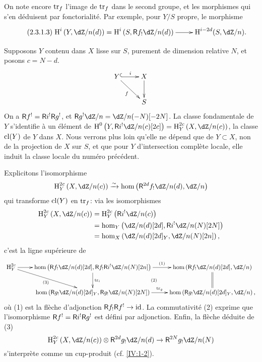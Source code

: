 On note encore $\operatorname{tr}_f$ l'image de $\operatorname{tr}_f$ dans le second groupe, et les 
morphismes qui s'en déduisent par fonctorialité. Par exemple, pour $Y/S$ 
propre, le morphisme 
\begin{equation*}\tag{2.3.1.3}\label{IV:eq:2-3-1-3}
\xymatrix{
  \h^i\left(Y,\dZ/n(d)\right) = \h^i\left(S,\R f_!\dZ/n(d)\right) \ar[r] 
    & \h^{i-2 d}(S,\dZ/n) \text{.}
}
\end{equation*}

Supposons $Y$ contenu dans $X$ lisse sur $S$, purement de dimension relative 
$N$, et posons $c=N-d$. 
\[\xymatrix{
  Y \ar@{^{(}->}[r]^-i \ar[dr]_-f 
    & X \ar[d] \\
  & S
}\]
On a $\mathsf{R} f^! = \mathsf{R} i^!\mathsf{R} g^!$, et $\R g^! \dZ/n=\dZ/n(-N)[-2 N]$. La classe 
fondamentale de $Y$ s'identifie à un élément de 
$\h^0\left(Y,\R i^!\dZ/n(c)[2 c]\right)=\h_Y^{2 c}\left(X,\dZ/n(c)\right)$, la 
classe $\operatorname{cl}(Y)$ de $Y$ dans $X$. Nous verrons plus loin qu'elle ne dépend que 
de $Y\subset X$, non de la projection de $X$ sur $S$, et que pour $Y$ 
d'intersection complète locale, elle induit la classe locale du numéro 
précédent. 

Explicitons l'isomorphisme 
\[
  \h_Y^{2 c}\left(X,\dZ/n(c)\right) \iso \hom\left(\R^{2 d}f_!\dZ/n(d),\dZ/n\right)
\]
qui transforme $\operatorname{cl}(Y)$ en $\operatorname{tr}_f$: via les isomorphismes 
\begin{align*}
  \h_Y^{2 c}\left(X,\dZ/n(c)\right) 
    &= \h_Y^{2 c}\left(\R i^!\dZ/n(c)\right) \\
    &= \hom_Y\left(\dZ/n(d)[2 d],\R i^!\dZ/n(N)[2 N]\right) \\
    &= \hom_X\left(\dZ/n(d)[2 d]_Y,\dZ/n(N)[2 n]\right) \text{,}
\end{align*}
c'est la ligne supérieure de 
\[\xymatrix{
  \h_Y^{2 c} \ar[r] \ar[dr]_-{(3)} 
    & \hom\left(\R f_!\dZ/n(d)[2 d],\R f_! \R i^!\dZ/n(N)[2 n]\right) \ar[r]^-{(1)} \ar[d]^-{\tr_i} \ar@{}[dr]|-{(2)}
    & \hom\left(\R f_!\dZ/n(d)[2d],\dZ/n\right) \ar@{=}[d] \\
  & \hom\left(\R g_!\dZ/n(d)[2 d]_Y,\R g_!\dZ/n(N)[2 N]\right) \ar[r]^-{\tr_g} 
    & \hom\left(\R g_!\dZ/n(d)[2 d]_Y,\dZ/n\right) \text{,}
}\]
où (1) est la flèche d'adjonction $\mathsf{R} f_!\mathsf{R} f^!\to \text{id}$. La 
commutativité (2) exprime que l'isomorphisme $\mathsf{R} f^!=\mathsf{R} i^!\mathsf{R} g^!$ est 
défini par adjonction. Enfin, la flèche déduite de (3)
\[
  \h_Y^{2c}\left(X,\dZ/n(c)\right) \otimes \R^{2 d} g_!\dZ/n(d) \to \R^{2 N} g_!\dZ/n(N)
\]
s'interprète comme un cup-produit (cf. \ref{IV:1-2}). 





